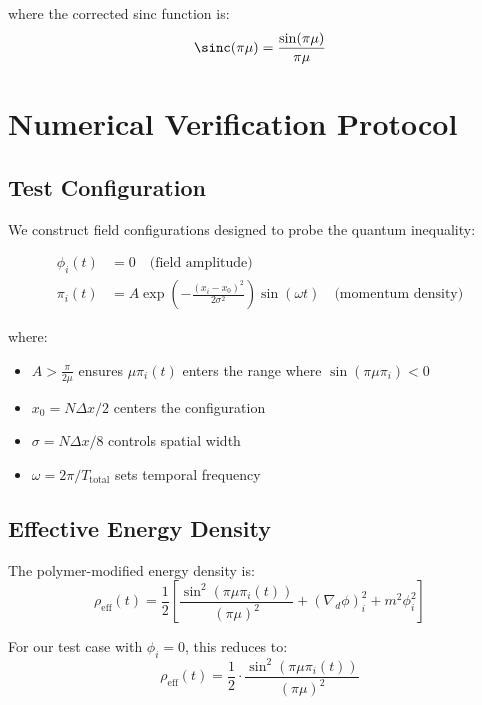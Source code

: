 \documentclass[11pt,a4paper]{article}
\begin{document}
where the corrected sinc function is:
\begin{equation}
\sinc(\pi\mu) = \frac{\sin(\pi\mu)}{\pi\mu}
\end{equation}

\section{Numerical Verification Protocol}

\subsection{Test Configuration}

We construct field configurations designed to probe the quantum inequality:

\begin{align}
\phi_i(t) &= 0 \quad \text{(field amplitude)} \\
\pi_i(t) &= A \exp\left(-\frac{(x_i - x_0)^2}{2\sigma^2}\right) \sin(\omega t) \quad \text{(momentum density)}
\end{align}

where:
\begin{itemize}
\item $A > \frac{\pi}{2\mu}$ ensures $\mu\pi_i(t)$ enters the range where $\sin(\pi\mu\pi_i) < 0$
\item $x_0 = N\Delta x / 2$ centers the configuration
\item $\sigma = N\Delta x / 8$ controls spatial width
\item $\omega = 2\pi / T_{\text{total}}$ sets temporal frequency
\end{itemize}

\subsection{Effective Energy Density}

The polymer-modified energy density is:
\begin{equation}
\rho_{\text{eff}}(t) = \frac{1}{2}\left[\frac{\sin^2(\pi\mu\pi_i(t))}{(\pi\mu)^2} + (\nabla_d \phi)_i^2 + m^2\phi_i^2\right]
\end{equation}

For our test case with $\phi_i = 0$, this reduces to:
\begin{equation}
\rho_{\text{eff}}(t) = \frac{1}{2} \cdot \frac{\sin^2(\pi\mu\pi_i(t))}{(\pi\mu)^2}
\end{equation}
\end{document}
